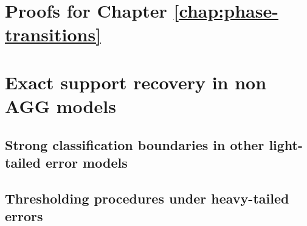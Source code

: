 \chapter{Proofs for Chapter \ref{chap:phase-transitions}}
\label{sec:supplement:proofs}





\chapter{Exact support recovery in non AGG models}

\section{Strong classification boundaries in other light-tailed error models}
\label{suppsec:other-boundaries}



\section{Thresholding procedures under heavy-tailed errors}
\label{suppsec:heavy-tailed}

